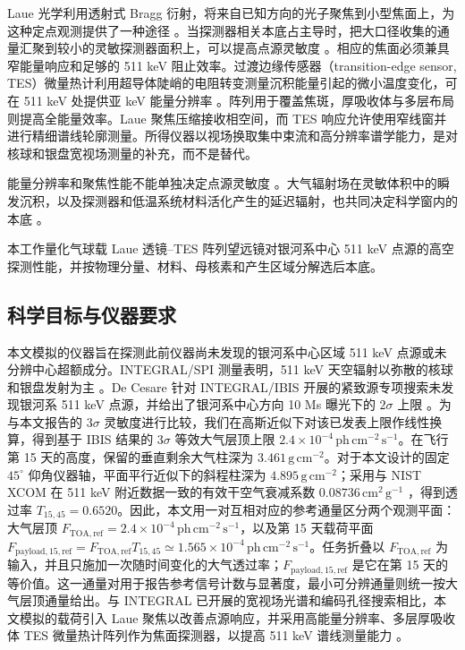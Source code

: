\documentclass[11pt]{article}
\newcommand{\phcms}{\,\mathrm{ph\,cm^{-2}\,s^{-1}}}
\newcommand{\ftoaref}{F_{\mathrm{TOA,ref}}}
\newcommand{\fpayloadref}{F_{\mathrm{payload,15,ref}}}
\begin{document}
Laue 光学利用透射式 Bragg 衍射，将来自已知方向的光子聚焦到小型焦面上，为这种定点观测提供了一种途径 \cite{Barriere2009Laue,Barriere2011LauePrototype}。当探测器相关本底占主导时，把大口径收集的通量汇聚到较小的灵敏探测器面积上，可以提高点源灵敏度 \cite{Weidenspointner2006MAX}。相应的焦面必须兼具窄能量响应和足够的 511 keV 阻止效率。过渡边缘传感器（transition-edge sensor, TES）微量热计利用超导体陡峭的电阻转变测量沉积能量引起的微小温度变化，可在 511 keV 处提供亚 keV 能量分辨率 \cite{Shirazi2023,Zhang2022TESGamma}。阵列用于覆盖焦斑，厚吸收体与多层布局则提高全能量效率。Laue 聚焦压缩接收相空间，而 TES 响应允许使用窄线窗并进行精细谱线轮廓测量。所得仪器以视场换取集中束流和高分辨率谱学能力，是对核球和银盘宽视场测量的补充，而不是替代。

能量分辨率和聚焦性能不能单独决定点源灵敏度 \cite{Shirazi2023,Hu2026}。大气辐射场在灵敏体积中的瞬发沉积，以及探测器和低温系统材料活化产生的延迟辐射，也共同决定科学窗内的本底 \cite{Gallego2025Balloon,Tian2026DIXE}。

本工作量化气球载 Laue 透镜--TES 阵列望远镜对银河系中心 511 keV 点源的高空探测性能，并按物理分量、材料、母核素和产生区域分解选后本底。

\subsection{科学目标与仪器要求}
\label{sec:requirements}

\begingroup
{}

本文模拟的仪器旨在探测此前仪器尚未发现的银河系中心区域 511 keV 点源或未分辨中心超额成分。INTEGRAL/SPI 测量表明，511 keV 天空辐射以弥散的核球和银盘发射为主 \cite{Siegert2016AA,Yoneda2025}。De Cesare 针对 INTEGRAL/IBIS 开展的紧致源专项搜索未发现银河系 511 keV 点源，并给出了银河系中心方向 10 Ms 曝光下的 $2\sigma$ 上限 \cite{DeCesare2011}。为与本文报告的 $3\sigma$ 灵敏度进行比较，我们在高斯近似下对该已发表上限作线性换算，得到基于 IBIS 结果的 $3\sigma$ 等效大气层顶上限 $2.4\times10^{-4}\phcms$。在飞行第 15 天的高度，保留的垂直剩余大气柱深为 $3.461\,\mathrm{g\,cm^{-2}}$。对于本文设计的固定 $45^\circ$ 仰角仪器轴，平面平行近似下的斜程柱深为 $4.895\,\mathrm{g\,cm^{-2}}$；采用与 NIST XCOM 在 511 keV 附近数据一致的有效干空气衰减系数 $0.08736\,\mathrm{cm^2\,g^{-1}}$ \cite{NISTXCOM}，得到透过率 $T_{15,45}=0.6520$。因此，本文用一对互相对应的参考通量区分两个观测平面：大气层顶 $\ftoaref=2.4\times10^{-4}\phcms$，以及第 15 天载荷平面 $\fpayloadref=\ftoaref T_{15,45}\simeq1.565\times10^{-4}\phcms$。任务折叠以 $\ftoaref$ 为输入，并且只施加一次随时间变化的大气透过率；$\fpayloadref$ 是它在第 15 天的等价值。这一通量对用于报告参考信号计数与显著度，最小可分辨通量则统一按大气层顶通量给出。与 INTEGRAL 已开展的宽视场光谱和编码孔径搜索相比，本文模拟的载荷引入 Laue 聚焦以改善点源响应，并采用高能量分辨率、多层厚吸收体 TES 微量热计阵列作为焦面探测器，以提高 511 keV 谱线测量能力 \cite{Shirazi2023,Caputo2017}。
\end{document}
